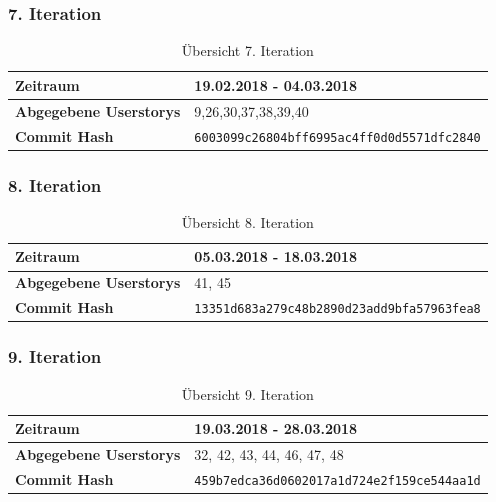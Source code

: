 \documentclass[accentcolor=tud9c,12pt,paper=a4]{tudreport}
\begin{document}
	\subsubsection{7. Iteration}
	\begin{table}[H]
	\begin{center}
		\begin{tabular}{| l | l |}
			\hline
			\textbf{Zeitraum} &  19.02.2018 - 04.03.2018\\\hline
			\textbf{Abgegebene Userstorys} & 9,26,30,37,38,39,40\\\hline
			\textbf{Commit Hash} & \texttt{6003099c26804bff6995ac4ff0d0d5571dfc2840} \\\hline
		\end{tabular}
		\caption{Übersicht 7. Iteration}
	\end{center}
	\end{table}

	\subsubsection{8. Iteration}
	\begin{table}[H]
	\begin{center}
		\begin{tabular}{| l | l |}
			\hline
			\textbf{Zeitraum} &  05.03.2018 - 18.03.2018\\\hline
			\textbf{Abgegebene Userstorys} & 41, 45\\\hline
			\textbf{Commit Hash} & \texttt{13351d683a279c48b2890d23add9bfa57963fea8} \\\hline
		\end{tabular}
		\caption{Übersicht 8. Iteration}
	\end{center}
	\end{table}

	\subsubsection{9. Iteration}
	\begin{table}[H]
	\begin{center}
		\begin{tabular}{| l | l |}
			\hline
			\textbf{Zeitraum} &  19.03.2018 - 28.03.2018\\\hline
			\textbf{Abgegebene Userstorys} & 32, 42, 43, 44, 46, 47, 48\\\hline
			\textbf{Commit Hash} & \texttt{459b7edca36d0602017a1d724e2f159ce544aa1d} \\\hline
		\end{tabular}
		\caption{Übersicht 9. Iteration}
	\end{center}
	\end{table}
\end{document}
